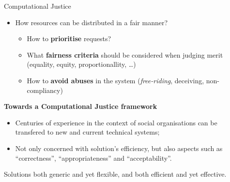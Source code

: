 \begin{frame}{Computational Justice}

\begin{itemize}
\tightlist
\item
  How resources can be distributed in a \alert{fair} manner?

  \begin{itemize}
  \tightlist
  \item
    How to \textbf{prioritise} requests?
  \item
    What \textbf{fairness criteria} should be considered when judging
    merit (equality, equity, proportionallity, \ldots{})
  \item
    How to \textbf{avoid abuses} in the system (\emph{free-riding},
    deceiving, non-compliancy)
  \end{itemize}
\end{itemize}

\pause

\textbf{Towards a Computational Justice framework}

\begin{itemize}
\tightlist
\item
  Centuries of experience in the context of social organisations can be
  transfered to new and current technical systems;
\item
  Not only concerned with solution's efficiency, but also aspects such
  as ``correctness'', ``appropriateness'' and ``acceptability''.
\end{itemize}

\begin{block}{}

Solutions both generic and yet flexible, and both efficient and yet
effective.

\end{block}

\end{frame}

